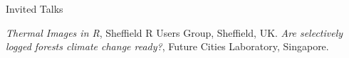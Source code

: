 \begin{rubric}{Invited Talks}

\entry*[2017] \emph{Thermal Images in R}, Sheffield R Users Group, Sheffield, UK.
\entry*[2016] \emph{Are selectively logged forests climate change ready?}, Future Cities Laboratory, Singapore.

\end{rubric}